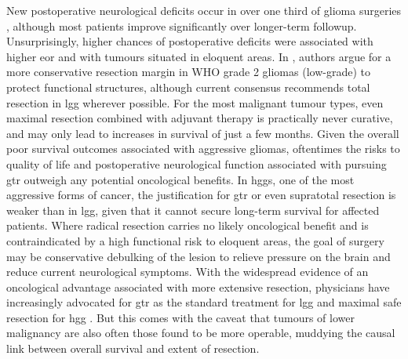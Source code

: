 New postoperative neurological deficits occur in over one third of glioma surgeries \autocite{Zetterling2020a}, although most patients improve significantly over longer-term followup.
Unsurprisingly, higher chances of postoperative deficits were associated with higher \gls{eor} and with tumours situated in eloquent areas\autocite{Zetterling2020a}.
In \textcite{Gil-Robles2010}, authors argue for a more conservative resection margin in WHO grade 2 gliomas (low-grade) to protect functional structures, although current consensus recommends total resection in \gls{lgg} wherever possible\autocite{Rincon-Torroella2019,Albuquerque2021}. %
For the most malignant tumour types, even maximal resection combined with adjuvant therapy is practically never curative, and may only lead to increases in survival of just a few months\autocite{Rincon-Torroella2019,Karschnia2023}.
Given the overall poor survival outcomes associated with aggressive gliomas, oftentimes the risks to quality of life and postoperative neurological function associated with pursuing \gls{gtr} outweigh any potential oncological benefits\autocite{Rahman2016,Tabor2021}.
In \glspl{hgg}, one of the most aggressive forms of cancer, the justification for \gls{gtr} or even supratotal resection is weaker than in \gls{lgg}, given that it cannot secure long-term survival for affected patients.
Where radical resection carries no likely oncological benefit and is contraindicated by a high functional risk to eloquent areas, the goal of surgery may be conservative debulking of the lesion to relieve pressure on the brain and reduce current neurological symptoms.
With the widespread evidence of an oncological advantage associated with more extensive resection, physicians have increasingly advocated for \gls{gtr} as the standard treatment for \gls{lgg} and maximal safe resection for \gls{hgg} \autocite{Rincon-Torroella2019}.
But this comes with the caveat that tumours of lower malignancy are also often those found to be more operable, muddying the causal link between overall survival and extent of resection\autocite{Weller2021}.
